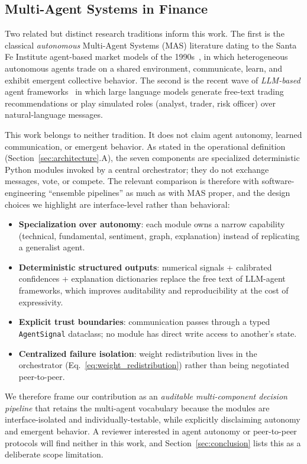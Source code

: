 \documentclass[conference]{IEEEtran}
\begin{document}
\subsection{Multi-Agent Systems in Finance}

Two related but distinct research traditions inform this work. The first is the classical \emph{autonomous} Multi-Agent Systems (MAS) literature dating to the Santa Fe Institute agent-based market models of the 1990s~\cite{ref:multi_agent}, in which heterogeneous autonomous agents trade on a shared environment, communicate, learn, and exhibit emergent collective behavior. The second is the recent wave of \emph{LLM-based} agent frameworks~\cite{ref:yang_fingpt,ref:lopez_lira_chatgpt} in which large language models generate free-text trading recommendations or play simulated roles (analyst, trader, risk officer) over natural-language messages.

This work belongs to neither tradition. It does not claim agent autonomy, learned communication, or emergent behavior. As stated in the operational definition (Section~\ref{sec:architecture}.A), the seven components are specialized deterministic Python modules invoked by a central orchestrator; they do not exchange messages, vote, or compete. The relevant comparison is therefore with software-engineering ``ensemble pipelines'' as much as with MAS proper, and the design choices we highlight are interface-level rather than behavioral:
\begin{itemize}
\item \textbf{Specialization over autonomy}: each module owns a narrow capability (technical, fundamental, sentiment, graph, explanation) instead of replicating a generalist agent.
\item \textbf{Deterministic structured outputs}: numerical signals + calibrated confidences + explanation dictionaries replace the free text of LLM-agent frameworks, which improves auditability and reproducibility at the cost of expressivity.
\item \textbf{Explicit trust boundaries}: communication passes through a typed \texttt{AgentSignal} dataclass; no module has direct write access to another's state.
\item \textbf{Centralized failure isolation}: weight redistribution lives in the orchestrator (Eq.~\ref{eq:weight_redistribution}) rather than being negotiated peer-to-peer.
\end{itemize}

We therefore frame our contribution as an \emph{auditable multi-component decision pipeline} that retains the multi-agent vocabulary because the modules are interface-isolated and individually-testable, while explicitly disclaiming autonomy and emergent behavior. A reviewer interested in agent autonomy or peer-to-peer protocols will find neither in this work, and Section~\ref{sec:conclusion} lists this as a deliberate scope limitation.
\end{document}
